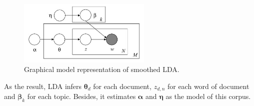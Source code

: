 \begin{figure}[!t]
\centering
\includegraphics[width=2.5in]{fig/LDA_model2.jpg}
\caption{Graphical model representation of smoothed LDA.}
\label{fig:LDA_model2}
\end{figure}

As the result, LDA infers $\boldsymbol{\theta}_d$ for each document, $z_{d,n}$ for each word of document and $\boldsymbol{\beta}_k$ for each topic. Besides, it estimates $\boldsymbol{\alpha}$ and $\boldsymbol{\eta}$ as the model of this corpus.